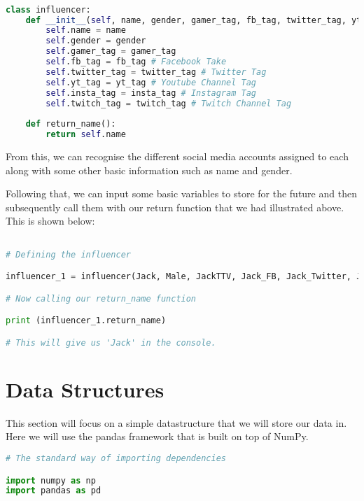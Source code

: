 \documentclass[12pt, letterpaper]{article}
\begin{document}
\begin{lstlisting}[language=python]

class influencer:
	def __init__(self, name, gender, gamer_tag, fb_tag, twitter_tag, yt_tag, insta_tag, twitch_tag):
		self.name = name
		self.gender = gender
		self.gamer_tag = gamer_tag
		self.fb_tag = fb_tag # Facebook Take
		self.twitter_tag = twitter_tag # Twitter Tag
		self.yt_tag = yt_tag # Youtube Channel Tag
		self.insta_tag = insta_tag # Instagram Tag
		self.twitch_tag = twitch_tag # Twitch Channel Tag
	
	def return_name():
		return self.name

\end{lstlisting}

From this, we can recognise the different social media accounts assigned to each along with some other basic information such as name and gender.

Following that, we can input some basic variables to store for the future and then subsequently call them with our return function that we had illustrated above. This is shown below:

\begin{lstlisting}[language=python]

# Defining the influencer

influencer_1 = influencer(Jack, Male, JackTTV, Jack_FB, Jack_Twitter, Jack_YT, Jack_Insta, Jack_Twitch)

# Now calling our return_name function

print (influencer_1.return_name)

# This will give us 'Jack' in the console.

\end{lstlisting}

\section{Data Structures}
This section will focus on a simple datastructure that we will store our data in. Here we will use the pandas framework that is built on top of NumPy.

\begin{lstlisting}[language=python]
# The standard way of importing dependencies

import numpy as np
import pandas as pd




\end{lstlisting}
\end{document}
